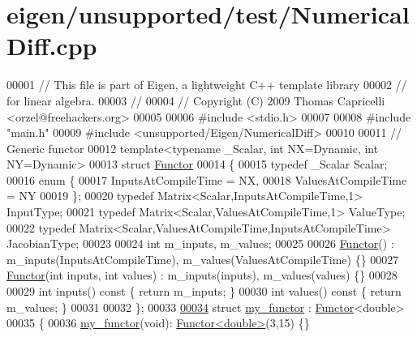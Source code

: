 \hypertarget{eigen_2unsupported_2test_2_numerical_diff_8cpp_source}{}\section{eigen/unsupported/test/\+Numerical\+Diff.cpp}
\label{eigen_2unsupported_2test_2_numerical_diff_8cpp_source}

\begin{DoxyCode}
00001 \textcolor{comment}{// This file is part of Eigen, a lightweight C++ template library}
00002 \textcolor{comment}{// for linear algebra.}
00003 \textcolor{comment}{//}
00004 \textcolor{comment}{// Copyright (C) 2009 Thomas Capricelli <orzel@freehackers.org>}
00005 
00006 \textcolor{preprocessor}{#include <stdio.h>}
00007 
00008 \textcolor{preprocessor}{#include "main.h"}
00009 \textcolor{preprocessor}{#include <unsupported/Eigen/NumericalDiff>}
00010     
00011 \textcolor{comment}{// Generic functor}
00012 \textcolor{keyword}{template}<\textcolor{keyword}{typename} \_Scalar, \textcolor{keywordtype}{int} NX=Dynamic, \textcolor{keywordtype}{int} NY=Dynamic>
00013 \textcolor{keyword}{struct }\hyperlink{struct_functor}{Functor}
00014 \{
00015   \textcolor{keyword}{typedef} \_Scalar Scalar;
00016   \textcolor{keyword}{enum} \{
00017     InputsAtCompileTime = NX,
00018     ValuesAtCompileTime = NY
00019   \};
00020   \textcolor{keyword}{typedef} Matrix<Scalar,InputsAtCompileTime,1> InputType;
00021   \textcolor{keyword}{typedef} Matrix<Scalar,ValuesAtCompileTime,1> ValueType;
00022   \textcolor{keyword}{typedef} Matrix<Scalar,ValuesAtCompileTime,InputsAtCompileTime> JacobianType;
00023   
00024   \textcolor{keywordtype}{int} m\_inputs, m\_values;
00025   
00026   \hyperlink{struct_functor}{Functor}() : m\_inputs(InputsAtCompileTime), m\_values(ValuesAtCompileTime) \{\}
00027   \hyperlink{struct_functor}{Functor}(\textcolor{keywordtype}{int} inputs, \textcolor{keywordtype}{int} values) : m\_inputs(inputs), m\_values(values) \{\}
00028   
00029   \textcolor{keywordtype}{int} inputs()\textcolor{keyword}{ const }\{ \textcolor{keywordflow}{return} m\_inputs; \}
00030   \textcolor{keywordtype}{int} values()\textcolor{keyword}{ const }\{ \textcolor{keywordflow}{return} m\_values; \}
00031 
00032 \};
00033 
\hyperlink{structmy__functor}{00034} \textcolor{keyword}{struct }\hyperlink{structmy__functor}{my\_functor} : \hyperlink{struct_functor}{Functor}<double>
00035 \{
00036     \hyperlink{structmy__functor}{my\_functor}(\textcolor{keywordtype}{void}): \hyperlink{struct_functor}{Functor<double>}(3,15) \{\}

\end{DoxyCode}
